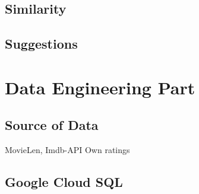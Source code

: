\documentclass{article}
\begin{document}
\subsection{Similarity}

\subsection{Suggestions}


\section{Data Engineering Part}

\subsection{Source of Data}

MovieLen, Imdb-API
Own ratings


\subsection{Google Cloud SQL}
\end{document}
